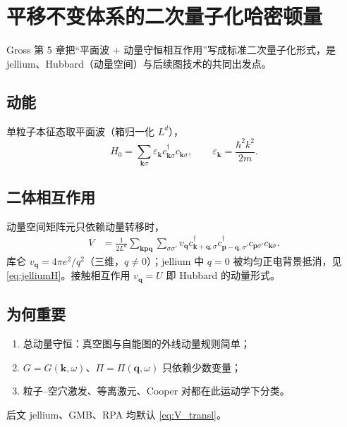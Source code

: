 \section{平移不变体系的二次量子化哈密顿量}

Gross 第 5 章把“平面波 + 动量守恒相互作用”写成标准二次量子化形式，是 jellium、Hubbard（动量空间）与后续图技术的共同出发点。

\subsection{动能}

单粒子本征态取平面波（箱归一化 $L^d$），
\begin{equation}
  H_0
  =\sum_{\mathbf{k}\sigma}
  \varepsilon_{\mathbf{k}}
  c_{\mathbf{k}\sigma}^\dagger c_{\mathbf{k}\sigma},
  \qquad
  \varepsilon_{\mathbf{k}}=\frac{\hbar^2k^2}{2m}.
\end{equation}

\subsection{二体相互作用}

动量空间矩阵元只依赖动量转移时，
\begin{equation}
\begin{aligned}
  V
  &=\frac{1}{2L^d}
  \sum_{\mathbf{k}\mathbf{p}\mathbf{q}}
  \sum_{\sigma\sigma'}
  v_{\mathbf{q}}
  c_{\mathbf{k}+\mathbf{q},\sigma}^\dagger
  c_{\mathbf{p}-\mathbf{q},\sigma'}^\dagger
  c_{\mathbf{p}\sigma'}
  c_{\mathbf{k}\sigma}.
\end{aligned}
\label{eq:V_transl}
\end{equation}
库仑 $v_{\mathbf{q}}=4\pi e^2/q^2$（三维，$q\neq0$）；jellium 中 $q=0$ 被均匀正电背景抵消，见 \eqref{eq:jelliumH}。接触相互作用 $v_{\mathbf{q}}=U$ 即 Hubbard 的动量形式。

\subsection{为何重要}

\begin{enumerate}
  \item 总动量守恒：真空图与自能图的外线动量规则简单；
  \item $G=G(\mathbf{k},\omega)$、$\Pi=\Pi(\mathbf{q},\omega)$ 只依赖少数变量；
  \item 粒子--空穴激发、等离激元、Cooper 对都在此运动学下分类。
\end{enumerate}
后文 jellium、GMB、RPA 均默认 \eqref{eq:V_transl}。
